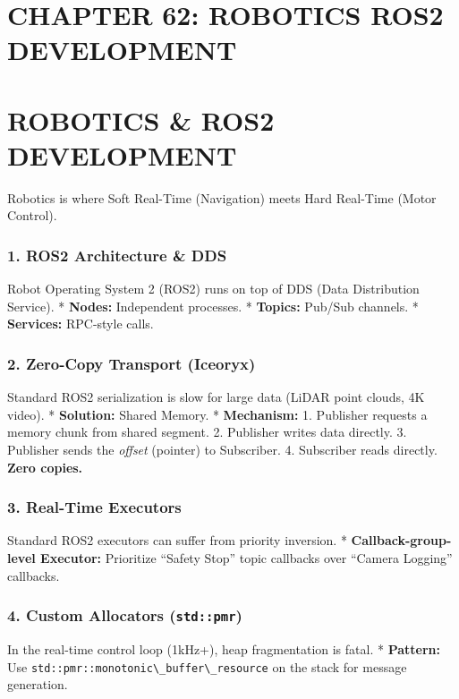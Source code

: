 \hypertarget{chapter-62-robotics-ros2-development}{%
\section{CHAPTER 62: ROBOTICS ROS2
DEVELOPMENT}\label{chapter-62-robotics-ros2-development}}

\hypertarget{robotics-ros2-development}{%
\section{ROBOTICS \& ROS2 DEVELOPMENT}\label{robotics-ros2-development}}

Robotics is where Soft Real-Time (Navigation) meets Hard Real-Time
(Motor Control).

\hypertarget{ros2-architecture-dds}{%
\subsubsection{1. ROS2 Architecture \&
DDS}\label{ros2-architecture-dds}}

Robot Operating System 2 (ROS2) runs on top of DDS (Data Distribution
Service). * \textbf{Nodes:} Independent processes. * \textbf{Topics:}
Pub/Sub channels. * \textbf{Services:} RPC-style calls.

\hypertarget{zero-copy-transport-iceoryx}{%
\subsubsection{2. Zero-Copy Transport
(Iceoryx)}\label{zero-copy-transport-iceoryx}}

Standard ROS2 serialization is slow for large data (LiDAR point clouds,
4K video). * \textbf{Solution:} Shared Memory. * \textbf{Mechanism:} 1.
Publisher requests a memory chunk from shared segment. 2. Publisher
writes data directly. 3. Publisher sends the \emph{offset} (pointer) to
Subscriber. 4. Subscriber reads directly. \textbf{Zero copies.}

\hypertarget{real-time-executors}{%
\subsubsection{3. Real-Time Executors}\label{real-time-executors}}

Standard ROS2 executors can suffer from priority inversion. *
\textbf{Callback-group-level Executor:} Prioritize ``Safety Stop'' topic
callbacks over ``Camera Logging'' callbacks.

\hypertarget{custom-allocators-stdpmr}{%
\subsubsection{\texorpdfstring{4. Custom Allocators
(\texttt{std::pmr})}{4. Custom Allocators (std::pmr)}}\label{custom-allocators-stdpmr}}

In the real-time control loop (1kHz+), heap fragmentation is fatal. *
\textbf{Pattern:} Use
\passthrough{\lstinline!std::pmr::monotonic\_buffer\_resource!} on the
stack for message generation.
